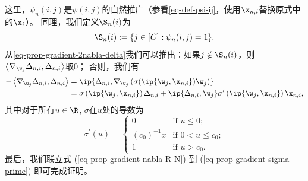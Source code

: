 \begin{myproof}
\begin{equation}
\end{equation}    
这里，$\psi_n(i,j)$是$\psi(i,j)$的自然推广（参看\cref{eq-def-psi-ij}，使用$\x_{n,i}$替换原式中的$\x_{i}$）。
同理，我们定义$\S_n(i)$为
\begin{equation}\label{eq-prop-gradient-def-Sni}
    \S_n(i) := \{ j \in [C] : \psi_n(i,{j{}}) = 1 \}.
\end{equation}
从\cref{eq-prop-gradient-2nabla-delta}我们可以推出：如果$j \notin \S_{n}(i)$，则$\left\langle \nabla_{\w_j}\Delta_{n,i}, \Delta_{n,i} \right\rangle$取$0$；
否则，我们有
\begin{equation}
\begin{aligned}
   - \left\langle \nabla_{\w_j}\Delta_{n,i}, \Delta_{n,i} \right\rangle 
    &= \ip{\Delta_{n,i} , \nabla_{\w_j} \left( \sigma(\ip{\w_j,\x_{n,i}}) \w_j \right) }\\
    &= \sigma\left(\ip{\w_j,\x_{n,i}} \right)\Delta_{n,i} + \ip{\Delta_{n,i}, \w_j} \sigma^{\prime}\left(\ip{\w_j,\x_{n,i}}  \right) \x_{n,i},
\end{aligned}
\end{equation}
其中对于所有$ u \in \R$, $\sigma$在$u$处的导数为 
\begin{equation}\label{eq-prop-gradient-sigma-prime}
    \sigma^{\prime}(u) = \left\{
    \begin{array}{cl}
        0 & \mbox{if } u \leq 0; \\
        (c_0)^{-1} x&\mbox{if }  0 < u \leq c_0; \\
        1& \mbox{if } u > c_0.
    \end{array}
    \right. 
\end{equation}
最后，我们联立式 (\ref{eq-prop-gradient-nabla-R-N}) 到 (\ref{eq-prop-gradient-sigma-prime}) 即可完成证明。
\end{myproof}


